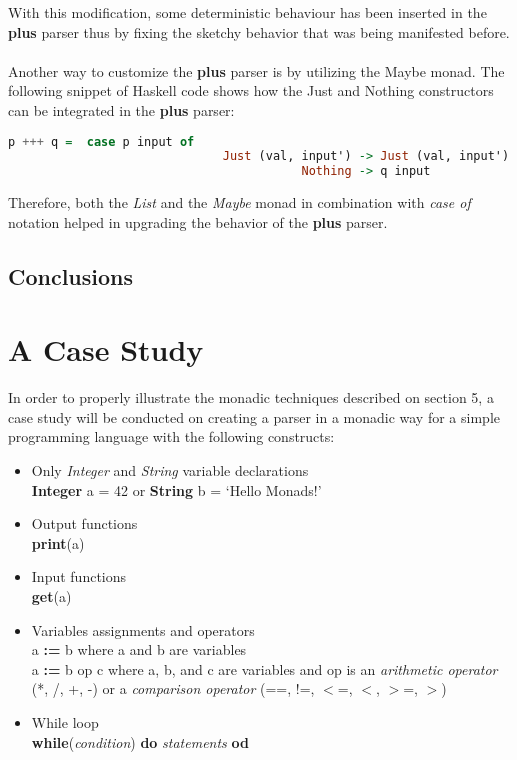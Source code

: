 \documentclass[a4paper, onecolumn]{article}
\begin{document}
     \noindent With this modification, some deterministic behaviour has been inserted in the \textbf{plus} parser thus by fixing the sketchy behavior that was being manifested before. \\ \\
     Another way to customize the \textbf{plus} parser is by utilizing the Maybe monad. The following snippet of Haskell code shows how the Just and Nothing constructors can be integrated in the \textbf{plus} parser:
     
     \begin{tcolorbox}
    \begin{lstlisting}[language=Haskell] 
        p +++ q =  case p input of
                              Just (val, input') -> Just (val, input')
                                         Nothing -> q input
    \end{lstlisting}
    \end{tcolorbox}
    
    Therefore, both the \textit{List} and the \textit{Maybe} monad in combination with \textit{case of} notation helped in upgrading the behavior of the \textbf{plus} parser. 
    
    
    \subsection{Conclusions}
    
    \section{A Case Study}
    
    In order to properly illustrate the monadic techniques described on section 5, a case study will be conducted on creating a parser in a monadic way for a simple programming language with the following constructs: 
    
    \begin{itemize}
        \item Only \textit{Integer} and \textit{String} variable declarations \\
        \textbf{Integer} a = 42 or \textbf{String} b = `Hello Monads!'
        \item Output functions \\ 
        \textbf{print}(a)
        \item Input functions \\
        \textbf{get}(a)
        \item Variables assignments and operators \\ 
        a \textbf{:=} b where a and b are variables \\ 
        a \textbf{:=} b op c where a, b, and c are variables and op is an \textit{arithmetic operator} (*, /, +, -) or a \textit{comparison operator} (==, !=, $<$=, $<$, $>$=, $>$) 
        \item While loop \\ 
        \textbf{while}(\textit{condition}) \textbf{do} \textit{statements} \textbf{od}
    \end{itemize}
    
\end{document}

